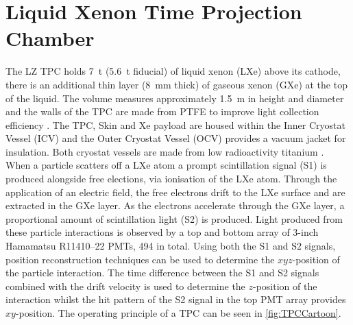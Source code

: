 \section{Liquid Xenon Time Projection Chamber}\label{sec:LXeTPC}
The LZ TPC holds 7~t (5.6~t fiducial) of liquid xenon (LXe) above its cathode, there is an additional thin layer (8~mm thick) of gaseous xenon (GXe) at the top of the liquid. The volume measures approximately 1.5~m in height and diameter and the walls of the TPC are made from PTFE to improve light collection efficiency \cite{LZNIMA}. The TPC, Skin and Xe payload are housed within the Inner Cryostat Vessel (ICV) and the Outer Cryostat Vessel (OCV) provides a vacuum jacket for insulation. Both cryostat vessels are made from low radioactivity titanium \cite{LZ:2017iwn}. When a particle scatters off a LXe atom a prompt scintillation signal (S1) is produced alongside free elections, via ionisation of the LXe atom. Through the application of an electric field, the free electrons drift to the LXe surface and are extracted in the GXe layer. As the electrons accelerate through the GXe layer, a proportional amount of scintillation light (S2) is produced. Light produced from these particle interactions is observed by a top and bottom array of 3-inch Hamamatsu R11410–22 PMTs, 494 in total. Using both the S1 and S2 signals, position reconstruction techniques can be used to determine the $xyz$-position of the particle interaction. The time difference between the S1 and S2 signals combined with the drift velocity is used to determine the $z$-position of the interaction whilst the hit pattern of the S2 signal in the top PMT array provides $xy$-position. The operating principle of a TPC can be seen in \autoref{fig:TPCCartoon}.
